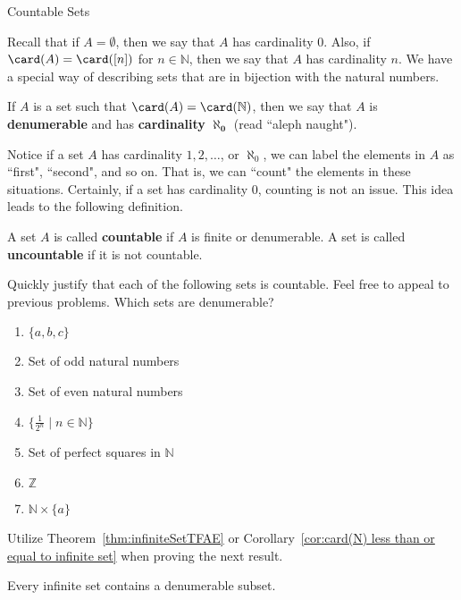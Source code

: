\begin{section}{Countable Sets}

Recall that if $A=\emptyset$, then we say that $A$ has cardinality 0.  Also, if $\card(A)=\card([n])$ for $n\in\mathbb{N}$, then we say that $A$ has cardinality $n$.  We have a special way of describing sets that are in bijection with the natural numbers.

\begin{definition}
If $A$ is a set such that $\card(A)=\card(\mathbb{N})$, then we say that $A$ is \textbf{denumerable} and has \textbf{cardinality} $\mathbf{\aleph_0}$ (read ``aleph naught").
\end{definition}

Notice if a set $A$ has cardinality $1,2,\ldots$, or $\aleph_0$, we can label the elements in $A$ as ``first", ``second", and so on.  That is, we can ``count" the elements in these situations. Certainly, if a set has cardinality 0, counting is not an issue.  This idea leads to the following definition.

\begin{definition}\label{def:countable}
A set $A$ is called \textbf{countable} if $A$ is finite or denumerable. A set is called \textbf{uncountable} if it is not countable.
\end{definition}

\begin{problem}
Quickly justify that each of the following sets is countable. Feel free to appeal to previous problems. Which sets are denumerable?
\begin{enumerate}[label=\textrm{(\alph*)}]
\item $\{a,b,c\}$
\item Set of odd natural numbers
\item Set of even natural numbers
\item $\{\frac{1}{2^n}\mid n\in \mathbb{N}\}$
\item Set of perfect squares in $\mathbb{N}$
\item $\mathbb{Z}$
\item $\mathbb{N}\times \{a\}$
\end{enumerate}
\end{problem}

Utilize Theorem~\ref{thm:infiniteSetTFAE} or Corollary~\ref{cor:card(N) less than or equal to infinite set} when proving the next result.

\begin{theorem}
Every infinite set contains a denumerable subset.
\end{theorem}


\end{section}

